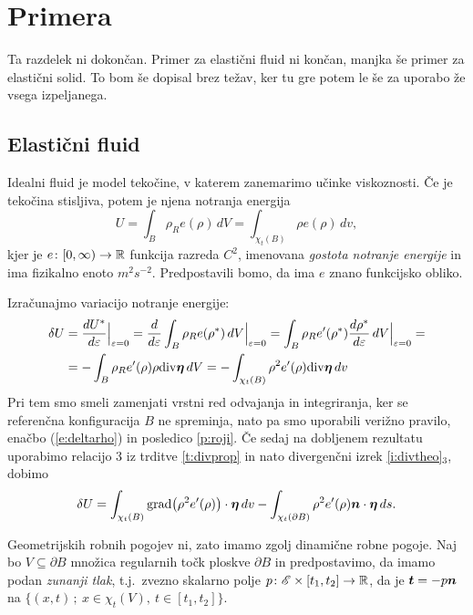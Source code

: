 \section{Primera}


\textcolor[rgb]{1,0,0}{Ta razdelek ni dokončan. Primer za elastični fluid ni končan,
manjka še primer za elastični solid. To bom še dopisal brez težav, ker tu gre
potem le še za uporabo že vsega izpeljanega.}

\subsection{Elastični fluid}


Idealni fluid je model tekočine, v katerem zanemarimo učinke viskoznosti. Če je tekočina
stisljiva, potem je njena notranja energija
\[ U=\int_{B}\rho_R e(\rho)\,dV=\int_{\chi_t(B)}\rho e(\rho)\,dv, \]
kjer je $e\colon[0,\infty)\to\mathbb R$ funkcija razreda $C^2$, imenovana
\emph{gostota notranje energije} in ima fizikalno enoto $m^2s^{-2}$.
Predpostavili bomo, da ima $e$ znano funkcijsko obliko.

Izračunajmo variacijo notranje energije:
\begin{align*} 
	\delta U &=\frac{dU^*}{d\varepsilon}\Big|_{\varepsilon=0}=\frac{d}{d\varepsilon}
	\int_{B}\rho_R e(\rho^*)\,dV \Big|_{\varepsilon=0} =
	\int_{B}\rho_R e'(\rho^*)\frac{d\rho^*}{d\varepsilon}\,dV \Big|_{\varepsilon=0} = \\
	&= -\int_{B}\rho_R e'(\rho)\rho\mathrm{div}\boldsymbol \eta\,dV
	= -\int_{\chi_t(B)}\rho^2 e'(\rho)\mathrm{div}\boldsymbol \eta\,dv
\end{align*}
Pri tem smo smeli zamenjati vrstni red odvajanja in integriranja, ker se referenčna
konfiguracija $B$ ne spreminja, nato pa smo uporabili verižno pravilo, enačbo
(\ref{e:deltarho}) in posledico \ref{p:roji}.
Če sedaj na dobljenem rezultatu uporabimo relacijo 3 iz trditve \ref{t:divprop} in
nato divergenčni izrek \ref{i:divtheo}$_3$, dobimo
\begin{equation} \label{e:varpot}
	\delta U=\int_{\chi_t(B)}\mathrm{grad}\big(\rho^2 e'(\rho)\big)\cdot\boldsymbol \eta\,dv
	-\int_{\chi_t(\partial B)}\rho^2 e'(\rho)\boldsymbol n\cdot\boldsymbol \eta\,ds.
\end{equation}

Geometrijskih robnih pogojev ni, zato imamo zgolj dinamične robne pogoje.
Naj bo $V\subseteq\partial B$ množica regularnih točk ploskve $\partial B$ in
predpostavimo, da imamo podan \emph{zunanji tlak}, t.j.~zvezno skalarno polje
$p\colon \mathscr E\times[t_1,t_2]\to\mathbb R$, da je $\boldsymbol t=-p\boldsymbol n$ na
$\{(x,t)\,;\ x\in\chi_t(V),\ t\in[t_1,t_2]\}$.

